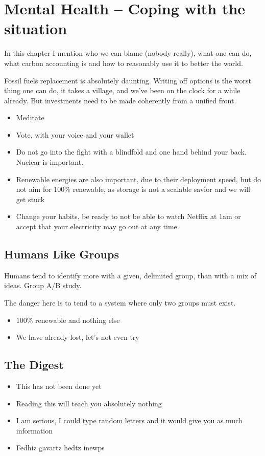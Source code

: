 \setchapterpreamble[u]{\margintoc}
\chapter{Mental Health -- Coping with the situation}

In this chapter I mention who we can blame (nobody really), what one can do, what carbon accounting is and how to reasonably use it to better the world.

Fossil fuels replacement is absolutely daunting. Writing off options is the worst thing one can do, it takes a village, and we’ve been on the clock for a while already. But investments need to be made coherently from a unified front.

\begin{itemize}
\item Meditate
\item Vote, with your voice and your wallet
\item Do not go into the fight with a blindfold and one hand behind your back. Nuclear is important.
\item Renewable energies are also important, due to their deployment speed, but do not aim for 100\% renewable, as storage is not a scalable savior and we will get stuck
\item Change your habits, be ready to not be able to watch Netflix at 1am or accept that your electricity may go out at any time.
\end{itemize}


\blindtext


\section{Humans Like Groups}

Humans tend to identify more with a given, delimited group, than with a mix of ideas. Group A/B study.

The danger here is to tend to a system where only two groups must exist. \begin{itemize}
\item 100\% renewable and nothing else
\item We have already lost, let's not even try
\end{itemize}


\blindtext

\section{The Digest}


\begin{kaoboxgreen}[frametitle=Main Takeaways]

\begin{itemize}
\item This has not been done yet
\item Reading this will teach you absolutely nothing
\item I am serious, I could type random letters and it would give you as much information
\item Fedhiz gavartz hedtz inewps
\end{itemize}
  
\end{kaoboxgreen}